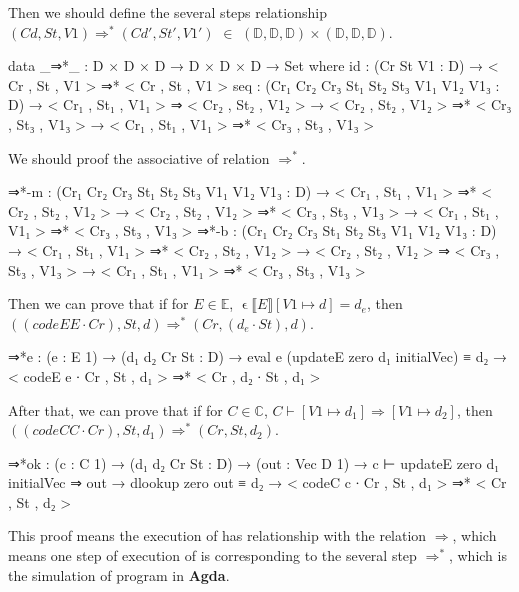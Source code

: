 Then we should define the several steps relationship $(Cd,St,V1)\Rightarrow^*(Cd',St',V1')$ $\in$  $(\mathds{D},\mathds{D},\mathds{D})\times (\mathds{D},\mathds{D},\mathds{D})$.
\begin{code}
data _⇒*_ : D × D × D → D × D × D → Set where
  id   : (Cr St V1 : D) → < Cr , St , V1 > ⇒* < Cr , St , V1 >
  seq  : (Cr₁ Cr₂ Cr₃ St₁ St₂ St₃ V1₁ V1₂ V1₃ : D)
         → < Cr₁ , St₁ , V1₁ > ⇒  < Cr₂ , St₂ , V1₂ >
         → < Cr₂ , St₂ , V1₂ > ⇒* < Cr₃ , St₃ , V1₃ >
         → < Cr₁ , St₁ , V1₁ > ⇒* < Cr₃ , St₃ , V1₃ >
\end{code}
We should proof the associative of relation $\Rightarrow^*$.
\begin{code}
  ⇒*-m : (Cr₁ Cr₂ Cr₃ St₁ St₂ St₃ V1₁ V1₂ V1₃ : D)
              → < Cr₁ , St₁ , V1₁ > ⇒* < Cr₂ , St₂ , V1₂ >
              → < Cr₂ , St₂ , V1₂ > ⇒* < Cr₃ , St₃ , V1₃ >
              → < Cr₁ , St₁ , V1₁ > ⇒* < Cr₃ , St₃ , V1₃ >
  ⇒*-b : (Cr₁ Cr₂ Cr₃ St₁ St₂ St₃ V1₁ V1₂ V1₃ : D)
              → < Cr₁ , St₁ , V1₁ > ⇒* < Cr₂ , St₂ , V1₂ >
              → < Cr₂ , St₂ , V1₂ > ⇒  < Cr₃ , St₃ , V1₃ >
              → < Cr₁ , St₁ , V1₁ > ⇒* < Cr₃ , St₃ , V1₃ >
\end{code}
Then we can prove that if for $E \in \mathds{E}$, $\upvarepsilon \llbracket E \rrbracket [V1 \mapsto d] = d_e$, then $((codeE E\cdot Cr),St,d)\Rightarrow^*(Cr,(d_e\cdot St),d)$.
\begin{code}
⇒*e : (e : E 1) → (d₁ d₂ Cr St : D)
       → eval e (updateE zero d₁ initialVec) ≡ d₂
       → < codeE e ∙ Cr , St , d₁ > ⇒* < Cr , d₂ ∙ St , d₁ >
\end{code}
After that, we can prove that if for $C \in \mathds{C}$, $C \vdash [V1 \mapsto d_1] \Rightarrow [V1 \mapsto d_2]$, then $((codeC C\cdot Cr),St,d_1)\Rightarrow^*(Cr,St,d_2)$.
\begin{code}
⇒*ok : (c : C 1) → (d₁ d₂ Cr St : D) → (out : Vec D 1)
       → c ⊢ updateE zero d₁ initialVec ⇒ out
       → dlookup zero out ≡ d₂
       → < codeC c ∙ Cr , St , d₁ > ⇒* < Cr , St , d₂ >
\end{code}
This proof means the execution of  has relationship with the relation $\Rightarrow$, which means one step of execution of  is corresponding to the several step $\Rightarrow^*$, which is the simulation of \WHILE program in \textbf{Agda}.
